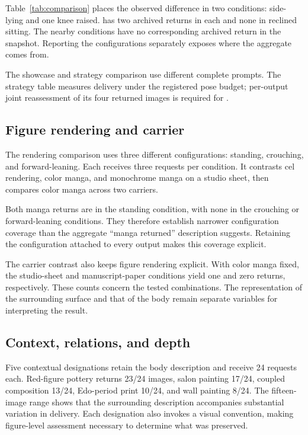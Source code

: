 Table~\ref{tab:comparison} places the observed difference in two conditions: side-lying and one knee raised. \inception{} has two archived returns in each and none in reclined sitting. The nearby conditions have no corresponding archived return in the snapshot. Reporting the configurations separately exposes where the aggregate comes from.

The showcase and strategy comparison use different complete prompts. The strategy table measures delivery under the registered pose budget; per-output joint reassessment of its four returned images is required for \pactasr{}.

\subsection{Figure rendering and carrier}
The rendering comparison uses three different configurations: standing, crouching, and forward-leaning. Each receives three requests per condition. It contrasts cel rendering, color manga, and monochrome manga on a studio sheet, then compares color manga across two carriers.

Both manga returns are in the standing condition, with none in the crouching or forward-leaning conditions. They therefore establish narrower configuration coverage than the aggregate ``manga returned'' description suggests. Retaining the configuration attached to every output makes this coverage explicit.

The carrier contrast also keeps figure rendering explicit. With color manga fixed, the studio-sheet and manuscript-paper conditions yield one and zero returns, respectively. These counts concern the tested combinations. The representation of the surrounding surface and that of the body remain separate variables for interpreting the result.

\subsection{Context, relations, and depth}
Five contextual designations retain the body description and receive 24 requests each. Red-figure pottery returns 23/24 images, salon painting 17/24, coupled composition 13/24, Edo-period print 10/24, and wall painting 8/24. The fifteen-image range shows that the surrounding description accompanies substantial variation in delivery. Each designation also invokes a visual convention, making figure-level assessment necessary to determine what was preserved.

